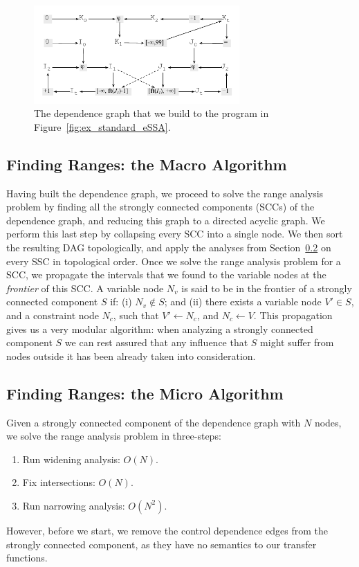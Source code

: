 \documentclass{llncs}
\begin{document}
\begin{figure}[t!]
\begin{center}
\includegraphics[width=0.7\textwidth]{images/ex_graph}
\end{center}
\caption{\label{fig:ex_graph}
The dependence graph that we build to the program in
Figure~\ref{fig:ex_standard_eSSA}.}
\end{figure}

\subsection{Finding Ranges: the Macro Algorithm}
\label{sub:macro}

Having built the dependence graph, we proceed to solve the range analysis
problem by finding all the strongly connected components (SCCs) of the
dependence graph, and reducing this graph to a directed acyclic graph.
We perform this last step by collapsing every SCC into a single node.
We then sort the resulting DAG topologically, and apply the analyses from
Section~\ref{sub:micro} on every SSC in topological order.
Once we solve the range analysis problem for a SCC, we propagate the
intervals that we found to the variable nodes at the {\em frontier} of this
SCC.
A variable node $N_v$ is said to be in the frontier of a strongly connected
component $S$ if:
(i) $N_v \notin S$; and
(ii) there exists a variable node $V' \in S$, and a constraint node $N_c$,
such that $V' \leftarrow N_c$, and $N_c \leftarrow V$.
This propagation gives us a very modular algorithm:
when analyzing a strongly connected component $S$ we can rest assured that
any influence that $S$ might suffer from nodes outside it has been already
taken into consideration.

\subsection{Finding Ranges: the Micro Algorithm}
\label{sub:micro}

Given a strongly connected component of the dependence graph with $N$ nodes,
we solve the range analysis problem in three-steps:
\begin{enumerate}
\item Run widening analysis: $O(N)$.

\item Fix intersections: $O(N)$.

\item Run narrowing analysis: $O(N^2)$.

\end{enumerate}
However, before we start, we remove the control dependence edges from the
strongly connected component, as they have no semantics to our transfer
functions.
\end{document}
